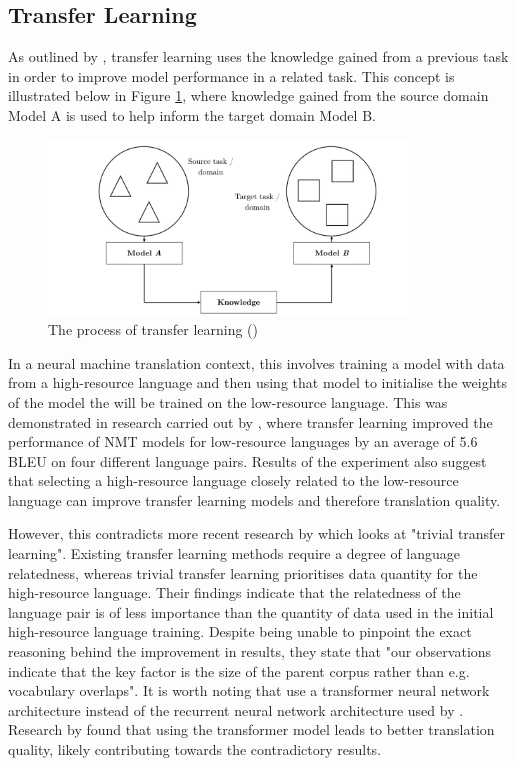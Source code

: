 \subsection{Transfer Learning}

As outlined by \cite{torrey_transfer_2009}, transfer learning uses the knowledge gained from a previous task in order to improve model performance in a related task. This concept is illustrated below in Figure \ref{fig:transfer}, where knowledge gained from the source domain Model A is used to help inform the target domain Model B.

\begin{figure}[ht!]
\centering
\includegraphics[width=0.85\textwidth]{media/literature/nmt_approaches/transfer.png}
\caption[Diagram of the transfer learning process]{The process of transfer learning (\cite{ruder_transfer_2019})}
\label{fig:transfer}
\end{figure}


In a neural machine translation context, this involves training a model with data from a high-resource language and then using that model to initialise the weights of the model the will be trained on the low-resource language.
This was demonstrated in research carried out by \cite{zoph_transfer_2016}, where transfer learning improved the performance of \acrshort{NMT} models for low-resource languages by an average of 5.6 \acrshort{BLEU} on four different language pairs. Results of the experiment also suggest that selecting a high-resource language closely related to the low-resource language can improve transfer learning models and therefore translation quality.

However, this contradicts more recent research by \cite{kocmi_trivial_2018} which looks at "trivial transfer learning". Existing transfer learning methods require a degree of language relatedness, whereas trivial transfer learning prioritises data quantity for the high-resource language. Their findings indicate that the relatedness of the language pair is of less importance than the quantity of data used in the initial high-resource language training. Despite being unable to pinpoint the exact reasoning behind the improvement in results, they state that "our observations indicate that the key factor is the size of the parent corpus rather than e.g. vocabulary overlaps".
It is worth noting that \cite{kocmi_trivial_2018} use a transformer neural network architecture instead of the recurrent neural network architecture used by \cite{zoph_transfer_2016}. Research by \cite{popel_training_2018} found that using the transformer model leads to better translation quality, likely contributing towards the contradictory results.


